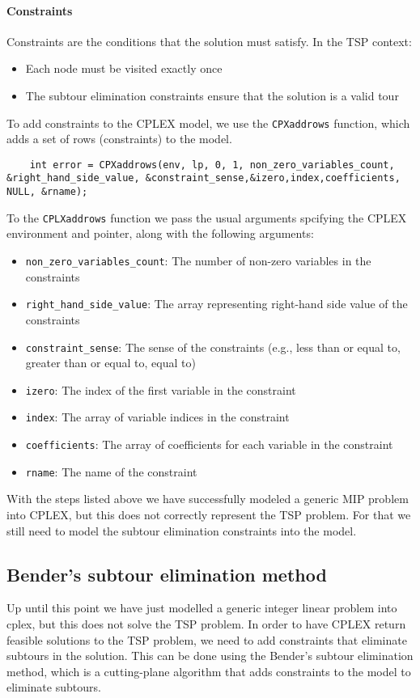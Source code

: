 \documentclass{article}
\begin{document}
\paragraph{Constraints}
Constraints are the conditions that the solution must satisfy. In the TSP context:
\begin{itemize}
	\item Each node must be visited exactly once
	\item The subtour elimination constraints ensure that the solution is a valid tour
\end{itemize}
To add constraints to the CPLEX model, we use the \texttt{CPXaddrows} function, which adds a set of rows (constraints) to the model.
\begin{lstlisting}
	int error = CPXaddrows(env, lp, 0, 1, non_zero_variables_count, &right_hand_side_value, &constraint_sense,&izero,index,coefficients, NULL, &rname);
\end{lstlisting}
To the \texttt{CPLXaddrows} function we pass the usual arguments spcifying the CPLEX environment and pointer, along with the following arguments:
\begin{itemize}
	\item \texttt{non\_zero\_variables\_count}: The number of non-zero variables in the constraints
	\item \texttt{right\_hand\_side\_value}: The array representing right-hand side value of the constraints
	\item \texttt{constraint\_sense}: The sense of the constraints (e.g., less than or equal to, greater than or equal to, equal to)
	\item \texttt{izero}: The index of the first variable in the constraint
	\item \texttt{index}: The array of variable indices in the constraint
	\item \texttt{coefficients}: The array of coefficients for each variable in the constraint
	\item \texttt{rname}: The name of the constraint
\end{itemize}

With the steps listed above we have successfully modeled a generic MIP problem into CPLEX, but this does not correctly represent the TSP problem. 
For that we still need to model the subtour elimination constraints into the model.

\subsection{Bender's subtour elimination method} 
Up until this point we have just modelled a generic integer linear problem into cplex, but this does not solve the TSP problem.
In order to have CPLEX return feasible solutions to the TSP problem, we need to add constraints that eliminate subtours in the solution.
This can be done using the Bender's subtour elimination method, which is a cutting-plane algorithm that adds constraints to the model to eliminate subtours.
\end{document}
